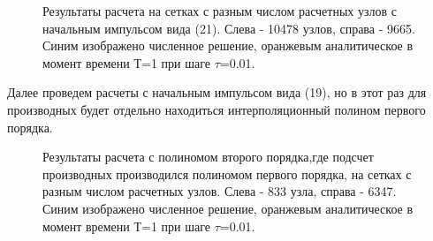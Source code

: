 \documentclass[14pt]{article}
\begin{document}
\begin{figure}[H]
\caption{Результаты расчета на сетках с разным числом расчетных узлов с начальным импульсом вида (21). Слева - 10478 узлов, справа - 9665. Синим изображено численное решение, оранжевым аналитическое в момент времени Т=1 при шаге $\tau$=0.01.}
\end{figure}
Далее проведем расчеты с начальным импульсом вида (19), но в этот раз  для производных будет отдельно находиться интерполяционный полином первого порядка.
\begin{figure}[H]
\caption{Результаты расчета с полиномом второго порядка,где подсчет производных производился полиномом первого порядка, на сетках с разным числом расчетных узлов. Слева - 833 узла, справа - 6347. Синим изображено численное решение, оранжевым аналитическое в момент времени Т=1 при шаге $\tau$=0.01.}
\end{figure}
\end{document}
